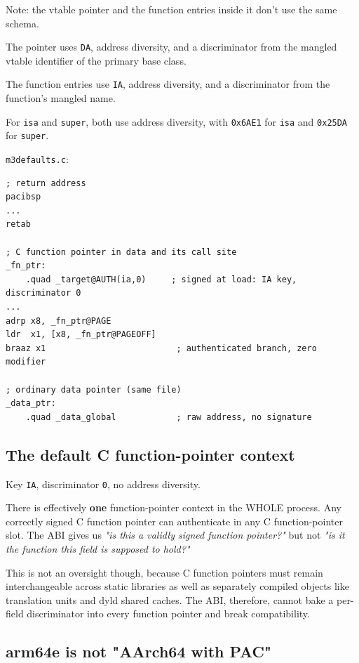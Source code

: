 Note: the vtable pointer and the function entries inside it don't use the same schema.

The pointer uses \texttt{DA}, address diversity, and a discriminator from the mangled vtable identifier of the primary base class.

The function entries use \texttt{IA}, address diversity, and a discriminator from the function's mangled name.


For \texttt{isa} and \texttt{super}, both use address diversity, with \texttt{0x6AE1} for \texttt{isa} and \texttt{0x25DA} for \texttt{super}.

\texttt{m3\uscore{}defaults.c}:

\begin{verbatim}
; return address
pacibsp
...
retab

; C function pointer in data and its call site
_fn_ptr:
    .quad _target@AUTH(ia,0)     ; signed at load: IA key, discriminator 0
...
adrp x8, _fn_ptr@PAGE
ldr  x1, [x8, _fn_ptr@PAGEOFF]
braaz x1                          ; authenticated branch, zero modifier

; ordinary data pointer (same file)
_data_ptr:
    .quad _data_global            ; raw address, no signature
\end{verbatim}

\subsection{The default C function-pointer context}

Key \texttt{IA}, discriminator \texttt{0}, no address diversity.

There is effectively \textbf{one} function-pointer context in the WHOLE process. Any correctly signed C function pointer can authenticate in any C function-pointer slot. The ABI gives us \textit{"is this a validly signed function pointer?"} but not \textit{"is it the function this field is supposed to hold?"}

This is not an oversight though, because C function pointers must remain interchangeable across static libraries as well as separately compiled objects like translation units and dyld shared caches. The ABI, therefore, cannot bake a per-field discriminator into every function pointer and break compatibility.

\subsection{arm64e is not "AArch64 with PAC"}

